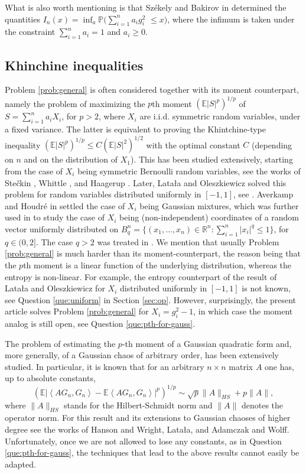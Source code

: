 \documentclass[11pt]{amsart}
\newcommand{\mb}[1]{\mathbb{{#1}}}
\newcommand{\1}{\mathbf{1}}
\newcommand{\R}{\mathbb{R}}
\newcommand{\E}{\mathbb{E}}
\newcommand{\scal}[2]{\left\langle #1, #2\right\rangle}
\theoremstyle{definition}
\theoremstyle{definition}
\theoremstyle{remark}
\begin{document}
What is also worth mentioning is that Sz\'ekely and Bakirov in \cite{SB03} determined the quantities $I_n(x) = \inf_a  \mb{P}(\sum_{i=1}^n a_i g_i^2$ $\leq x)$, where the infimum is taken under the constraint $\sum_{i=1}^n a_i=1$ and $a_i \geq 0$.       
 
\subsection{Khinchine inequalities} Problem \ref{prob:general} is often considered together with its moment counterpart, namely the problem of maximizing the $p$th moment $(\E|S|^p)^{1/p}$ of $S=\sum_{i=1}^n a_i X_i$, for $p>2$, where $X_i$ are i.i.d. symmetric random variables, under a fixed variance. The latter is equivalent to proving the Khintchine-type inequality $(\E|S|^p)^{1/p} \leq C (\E|S|^2)^{1/2}$ with the optimal constant $C$ (depending on $n$ and on the distribution of $X_1$). This has been studied extensively, starting from the case of $X_i$ being symmetric Bernoulli random variables, see the works of Ste\v{c}kin \cite{S61}, Whittle \cite{W60}, and Haagerup \cite{H82}. Later, Latała and Oleszkiewicz solved this problem for random variables distributed uniformly in $[-1,1]$, see \cite{LO}. Averkamp and Houdr\'e in \cite{AH03} settled the case of $X_i$ being  Gaussian mixtures, which was further used in \cite{ENT18} to study the case of $X_i$ being (non-independent) coordinates of a random vector uniformly distributed on $B_q^n=\{(x_1,\ldots, x_n) \in \R^n: \sum_{i=1}^n |x_i|^q \leq 1\}$, for $q \in (0,2]$. The case $q>2$ was treated in \cite{ENT18-2}.  We mention that usually Problem \ref{prob:general} is much harder than its moment-counterpart, the reason being that the $p$th moment is a linear function of the underlying distribution, whereas the entropy is non-linear. For example, the entropy counterpart of the result of Latała and Oleszkiewicz for $X_i$ distributed uniformly in $[-1,1]$ is not known, see Question \ref{que:uniform} in Section \ref{sec:op}. However, surprisingly, the present article solves Problem \ref{prob:general} for $X_i=g_i^2-1$, in which case the moment analog is still open, see  Question \ref{que:pth-for-gauss}. 

The problem of estimating the $p$-th moment of a Gaussian quadratic form and, more generally, of a Gaussian chaos of arbitrary order, has been extensively studied. In particular, it is known that for an arbitrary $n \times n$  matrix $A$ one has, up to absolute constants,  
\[
	\left(\E \left| \scal{A G_n}{G_n} - \E \scal{A G_n}{G_n} \right|^p \right)^{1/p} \sim \sqrt{p} \| A\|_{HS} + p \|A\|,
\]    
where $\|A\|_{HS}$ stands for the Hilbert-Schmidt norm and $\|A\|$ denotes the operator norm. For this result and its extensions to Gaussian chaoses of higher degree see the works \cite{HW71, L06, AW15} of Hanson and Wright, Latała, and Adamczak and Wolff. Unfortunately, once we are not allowed to lose any constants, as in Question \ref{que:pth-for-gauss}, the techniques that lead to the above results cannot easily be adapted. 
\end{document}
